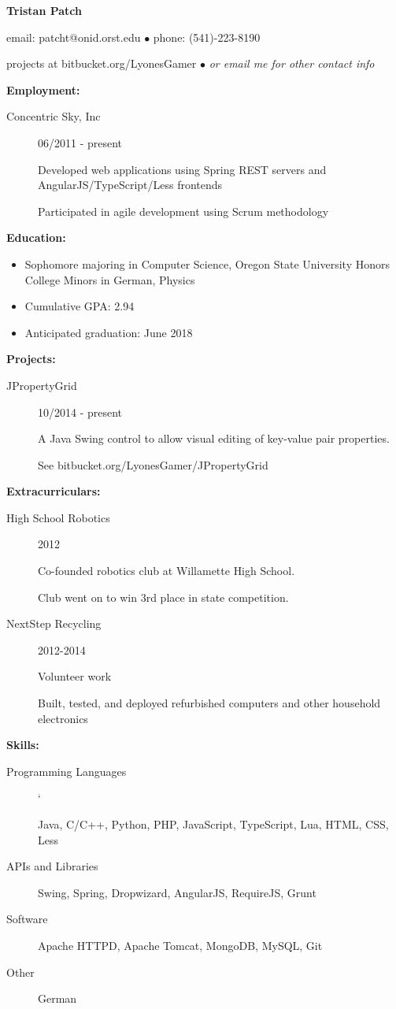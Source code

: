 \documentclass[11pt]{article}
\begin{document}
\centerline{{\LARGE \bf Tristan Patch}}
\bigskip
\centerline{email: patcht@onid.orst.edu
$\bullet$
phone: (541)-223-8190}
\centerline{projects at bitbucket.org/LyonesGamer
$\bullet$
\emph{or email me for other contact info}}
\bigskip
\hrulefill
\bigskip
{\Large \bf Employment:}
\begin{description}
\item[Concentric Sky, Inc]
\hfill 06/2011 - present

Developed web applications using Spring REST servers and AngularJS/TypeScript/Less frontends

Participated in agile development using Scrum methodology
\end{description}
\smallskip
\hrulefill
\bigskip
{\Large \bf Education:}
\begin{itemize}
\setlength{\itemsep}{1pt}
\setlength{\parskip}{0pt}
\setlength{\parsep}{0pt}
\item Sophomore majoring in Computer Science, Oregon State University
Honors College
Minors in German, Physics
\item Cumulative GPA: 2.94
\item Anticipated graduation: June 2018
\end{itemize}
\smallskip
\hrulefill
\bigskip
{\Large \bf Projects:}
\begin{description}
\item[JPropertyGrid]
\hfill 10/2014 - present

A Java Swing control to allow visual editing of key-value pair properties.

See bitbucket.org/LyonesGamer/JPropertyGrid
\end{description}
\smallskip
\hrulefill
\bigskip
{\Large \bf Extracurriculars:}
\begin{description}
\item[High School Robotics]
\hfill 2012

Co-founded robotics club at Willamette High School.

Club went on to win 3rd place in state competition.

\item[NextStep Recycling]
\hfill 2012-2014

Volunteer work

Built, tested, and deployed refurbished computers and other household electronics
\end{description}
\smallskip
\hrulefill
\bigskip
{\Large \bf Skills:}
\begin{description}
\item[Programming Languages]
\hfill`

Java, C/C++, Python, PHP, JavaScript, TypeScript, Lua, HTML, CSS, Less

\item[APIs and Libraries]
\hfill

Swing, Spring, Dropwizard, AngularJS, RequireJS, Grunt

\item[Software]
\hfill

Apache HTTPD, Apache Tomcat, MongoDB, MySQL, Git

\item[Other]
\hfill

German
\end{description}
\end{document}
